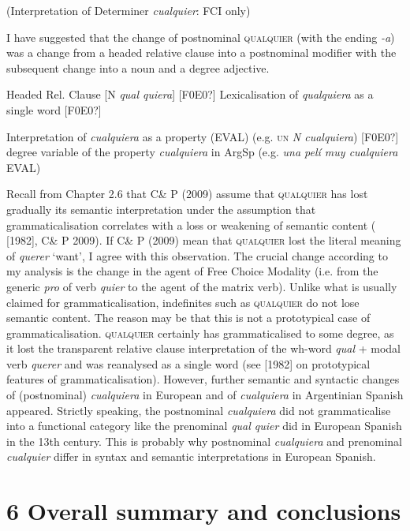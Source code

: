 (Interpretation of Determiner \textit{cualquier}: FCI only)

I have suggested that the change of postnominal \textsc{qualquier} (with the ending \textit{{}-a}) was a change from a headed relative clause into a postnominal modifier with the subsequent change into a noun and a degree adjective.

  Headed Rel. Clause [N \textit{qual quiera}] [F0E0?] Lexicalisation of \textit{qualquiera} as a single word [F0E0?]

    Interpretation of \textit{cualquiera} as a property (EVAL) (e.g. \textsc{un} \textit{N cualquiera}) [F0E0?] degree variable of the property \textit{cualquiera} in ArgSp (e.g. \textit{una pelí muy cualquiera} EVAL)

Recall from Chapter 2.6 that C\& P (2009) assume that \textsc{qualquier} has lost gradually its semantic interpretation under the assumption that grammaticalisation correlates with a loss or weakening of semantic content (\citealt{Lehmann2002} [1982], C\& P 2009). If C\& P (2009) mean that \textsc{qualquier} lost the literal meaning of \textit{querer} ‘want’, I agree with this observation. The crucial change according to my analysis is the change in the agent of Free Choice Modality (i.e. from the generic \textit{pro} of verb \textit{quier} to the agent of the matrix verb). Unlike what is usually claimed for grammaticalisation, indefinites such as \textsc{qualquier} do not lose semantic content. The reason may be that this is not a prototypical case of grammaticalisation. \textsc{qualquier} certainly has grammaticalised to some degree, as it lost the transparent relative clause interpretation of the wh-word \textit{qual} + modal verb \textit{querer} and was reanalysed as a single word (see \citealt{Lehmann2002} [1982] on prototypical features of grammaticalisation). However, further semantic and syntactic changes of (postnominal) \textit{cualquiera} in European and of \textit{cualquiera} in Argentinian Spanish appeared. Strictly speaking, the postnominal \textit{cualquiera} did not grammaticalise into a functional category like the prenominal \textit{qual quier} did in European Spanish in the 13th century. This is probably why postnominal \textit{cualquiera} and prenominal \textit{cualquier} differ in syntax and semantic interpretations in European Spanish. 

\chapter{6 Overall summary and conclusions}

